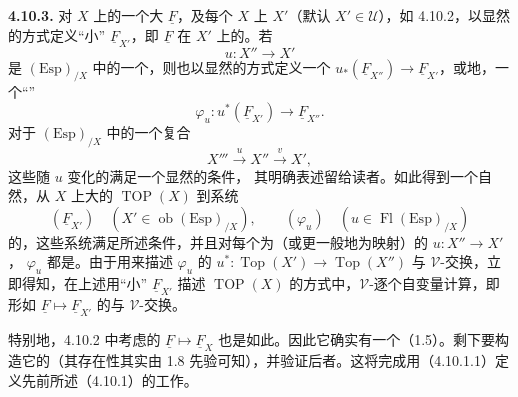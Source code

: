 \textbf{4.10.3.} 对 $X$ 上的一个大 $\underline F$，及每个 $X$ 上 $X'$（默认 $X'\in\mathcal U$），如 4.10.2，以显然的方式定义“小” $\underline F_{X'}$，即 $\underline F$ 在 $X'$ 上的。若
\[
 u:X''\longrightarrow X'
\]
是 $(\mathrm{Esp})_{/X}$ 中的一个，则也以显然的方式定义一个 $u_*(\underline F_{X''})\to\underline F_{X'}$，或地，一个“”
\[
 \varphi_u:u^*(\underline F_{X'})\longrightarrow\underline F_{X''}.\tag{4.10.3.1}
\]
对于 $(\mathrm{Esp})_{/X}$ 中的一个复合
\[
 X'''\xrightarrow{u}X''\xrightarrow{v}X',
\]
这些随 $u$ 变化的满足一个显然的条件，
其明确表述留给读者。如此得到一个自然，从 $X$ 上大的 $\operatorname{TOP}(X)$ 到系统
\[
 (\underline F_{X'})\quad(X'\in\operatorname{ob}(\mathrm{Esp})_{/X}),\qquad(\varphi_u)\quad(u\in\operatorname{Fl}(\mathrm{Esp})_{/X})
\]
的，这些系统满足所述条件，并且对每个为（或更一般地为映射）的 $u:X''\to X'$， $\varphi_u$ 都是。由于用来描述 $\varphi_u$ 的 $u^*:\operatorname{Top}(X')\to\operatorname{Top}(X'')$ 与 $\mathcal V$-交换，立即得知，在上述用“小” $\underline F_{X'}$ 描述 $\operatorname{TOP}(X)$ 的方式中，$\mathcal V$-逐个自变量计算，即形如 $\underline F\mapsto\underline F_{X'}$ 的与 $\mathcal V$-交换。

特别地，4.10.2 中考虑的 $\underline F\mapsto\underline F_X$ 也是如此。因此它确实有一个（1.5）。剩下要构造它的（其存在性其实由 1.8 先验可知），并验证后者。这将完成用（4.10.1.1）定义先前所述（4.10.1）的工作。

